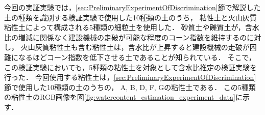 今回の実証実験では，\ref{sec:PreliminaryExperimentOfDiscrimination}節で解説した土の種類を識別する検証実験で使用した10種類の土のうち，
粘性土と火山灰質粘性土によって構成される5種類の細粒土を使用した．%
砂質土や礫質土が，含水比の増減に関係なく建設機械の走破が可能な程度のコーン指数を維持するのに対し，
火山灰質粘性土も含む粘性土は，含水比が上昇すると建設機械の走破が困難になるほどコーン指数を低下させる土であることが知られている\cite{Meyer1961}．%
そこで，この検証実験においても，5種類の粘性土を対象として含水比推定の検証実験を行った．
今回使用する粘性土は，\ref{sec:PreliminaryExperimentOfDiscrimination}節で使用した10種類の土のうちの，
A, B, D, F, Gの粘性土である．
この5種類の粘性土のRGB画像を図\ref{fig:watercontent_estimation_experiment_data}に示す．


